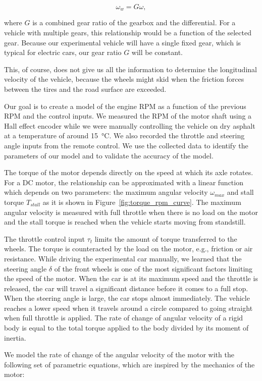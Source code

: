\[
\omega_w = G\omega,
\]

where $G$ is a combined gear ratio of the gearbox and the differential. For a vehicle with multiple gears, this relationship would be a function of the selected gear. Because our experimental vehicle will have a single fixed gear, which is typical for electric cars, our gear ratio $G$ will be constant.

This, of course, does not give us all the information to determine the longitudinal velocity of the vehicle, because the wheels might skid when the friction forces between the tires and the road surface are exceeded.

Our goal is to create a model of the engine RPM as a function of the previous \gls{RPM} and the control inputs. We measured the RPM of the motor shaft using a Hall effect encoder while we were manually controlling the vehicle on dry asphalt at a temperature of around \SI{15}{\degreeCelsius}. We also recorded the throttle and steering angle inputs from the remote control. We use the collected data to identify the parameters of our model and to validate the accuracy of the model.

The torque of the motor depends directly on the speed at which its axle rotates. For a DC motor, the relationship can be approximated with a linear function which depends on two parameters: the maximum angular velocity $\omega_{max}$ and stall torque $T_{stall}$ as it is shown in Figure~\ref{fig:torque_rpm_curve}. The maximum angular velocity is measured with full throttle when there is no load on the motor and the stall torque is reached when the vehicle starts moving from standstill.

The throttle control input $\tau_t$ limits the amount of torque transferred to the wheels. The torque is counteracted by the load on the motor, e.g., friction or air resistance. While driving the experimental car manually, we learned that the steering angle $\delta$ of the front wheels is one of the most significant factors limiting the speed of the motor. When the car is at its maximum speed and the throttle is released, the car will travel a significant distance before it comes to a full stop. When the steering angle is large, the car stops almost immediately. The vehicle reaches a lower speed when it travels around a circle compared to going straight when full throttle is applied. The rate of change of angular velocity of a rigid body is equal to the total torque applied to the body divided by its moment of inertia.

We model the rate of change of the angular velocity of the motor with the following set of parametric equations, which are inspired by the mechanics of the motor:

